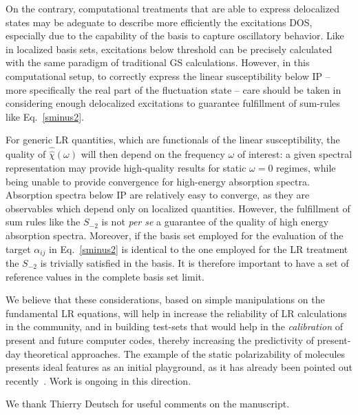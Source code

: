\documentclass[reprint,aps,prb]{revtex4-1}
\newcommand{\op}[1]{\hat {#1}}
\newcommand{\sop}[1]{\op{\op {#1}}}
\begin{document}
On the contrary, computational treatments that are able to express delocalized states may be adeguate to describe more efficiently the excitations DOS,
especially due to the capability of the basis to capture oscillatory behavior. Like in localized basis sets, excitations below threshold can be
precisely calculated with the same paradigm of traditional GS calculations. However, in this computational setup, to correctly express the linear susceptibility below IP -- more specifically the real part of the fluctuation state -- care should be taken in considering enough delocalized excitations
to guarantee fulfillment of sum-rules like Eq.~\eqref{sminus2}.

For generic LR quantities, which are functionals of the linear susceptibility, the quality of $\sop \chi(\omega)$ will then depend
on the frequency $\omega$ of interest: a given spectral representation may provide high-quality results for static $\omega=0$ regimes, while being
unable to provide convergence for high-energy absorption spectra.
Absorption spectra below IP are relatively easy to converge, as they are observables which depend only on localized quantities.
However, the fulfillment of sum rules like the $S_{-2}$ is not \textit{per se}
a guarantee of the quality of high energy absorption spectra.
Moreover, if the basis set employed for the evaluation of the target $\alpha_{ij}$ in  Eq.~\eqref{sminus2} is identical to the one employed for the LR treatment the $S_{-2}$
is trivially satisfied in the basis. It is therefore important to have a set of reference values
in the complete basis set limit.

We believe that these considerations, based on simple manipulations on the fundamental LR equations, will help in increase the reliability of LR
calculations in the community, and in building test-sets that would help in the \emph{calibration} of present and future computer codes, thereby
increasing the predictivity of present-day theoretical approaches. The example of the static polarizability of molecules
presents ideal features as an initial playground, as it has already been pointed out recently~\cite{HeadGordon}. Work is ongoing in this direction.

\begin{acknowledgments}
We thank Thierry Deutsch for useful comments on the manuscript.
\end{acknowledgments}

\appendix
\end{document}
